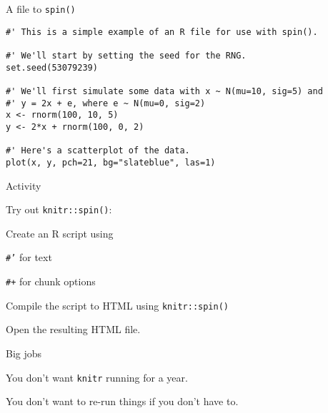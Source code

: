 \documentclass[12pt,t]{beamer}
\begin{document}
{\begin{frame}[fragile]{A file to {\tt spin()}}
\begin{lstlisting}
#' This is a simple example of an R file for use with spin().

#' We'll start by setting the seed for the RNG.
set.seed(53079239)

#' We'll first simulate some data with x ~ N(mu=10, sig=5) and
#' y = 2x + e, where e ~ N(mu=0, sig=2)
x <- rnorm(100, 10, 5)
y <- 2*x + rnorm(100, 0, 2)

#' Here's a scatterplot of the data.
plot(x, y, pch=21, bg="slateblue", las=1)
\end{lstlisting}

\end{frame}



\begin{frame}[c]{Activity}

Try out {\tt knitr::spin()}:

  \bi
      \item Create an R script using
      \bi
          \item {\tt \#'} for text
          \item {\tt \#+} for chunk options
      \ei
      \item Compile the script to HTML using {\tt knitr::spin()}
      \item Open the resulting HTML file.
  \ei


\end{frame}




\begin{frame}{Big jobs}

\bbi
\item You don't want {\tt knitr} running for a year.

\item You don't want to re-run things if you don't have to.
\ei

\end{frame}





}
\end{document}
